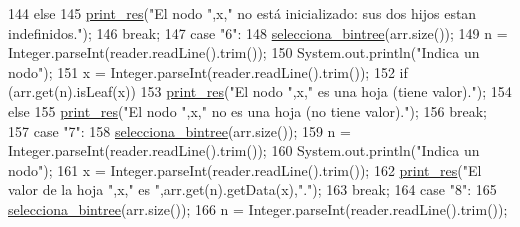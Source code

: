 \begin{DoxyCode}
144                         \textcolor{keywordflow}{else} 
145                             \hyperlink{classdomini_1_1utils_1_1Driver____BinTree_a434e26afb3eb701558d81b0fd1c29dcb}{print\_res}(\textcolor{stringliteral}{"El nodo "},x,\textcolor{stringliteral}{" no está inicializado: sus dos hijos estan
       indefinidos."});
146                     \textcolor{keywordflow}{break};
147                     \textcolor{keywordflow}{case} \textcolor{stringliteral}{"6"}:
148                         \hyperlink{classdomini_1_1utils_1_1Driver____BinTree_a0d90bf2cb928174547e712140b5a4fe5}{selecciona\_bintree}(arr.size());
149                         n = Integer.parseInt(reader.readLine().trim());
150                         System.out.println(\textcolor{stringliteral}{"Indica un nodo"});
151                         x = Integer.parseInt(reader.readLine().trim());
152                         \textcolor{keywordflow}{if} (arr.get(n).isLeaf(x))
153                             \hyperlink{classdomini_1_1utils_1_1Driver____BinTree_a434e26afb3eb701558d81b0fd1c29dcb}{print\_res}(\textcolor{stringliteral}{"El nodo "},x,\textcolor{stringliteral}{" es una hoja (tiene valor)."});
154                         \textcolor{keywordflow}{else} 
155                             \hyperlink{classdomini_1_1utils_1_1Driver____BinTree_a434e26afb3eb701558d81b0fd1c29dcb}{print\_res}(\textcolor{stringliteral}{"El nodo "},x,\textcolor{stringliteral}{" no es una hoja (no tiene valor)."});
156                     \textcolor{keywordflow}{break};
157                     \textcolor{keywordflow}{case} \textcolor{stringliteral}{"7"}:
158                         \hyperlink{classdomini_1_1utils_1_1Driver____BinTree_a0d90bf2cb928174547e712140b5a4fe5}{selecciona\_bintree}(arr.size());
159                         n = Integer.parseInt(reader.readLine().trim());
160                         System.out.println(\textcolor{stringliteral}{"Indica un nodo"});
161                         x = Integer.parseInt(reader.readLine().trim());
162                         \hyperlink{classdomini_1_1utils_1_1Driver____BinTree_a434e26afb3eb701558d81b0fd1c29dcb}{print\_res}(\textcolor{stringliteral}{"El valor de la hoja "},x,\textcolor{stringliteral}{" es "},arr.get(n).getData(x),\textcolor{stringliteral}{"."});
163                     \textcolor{keywordflow}{break};
164                     \textcolor{keywordflow}{case} \textcolor{stringliteral}{"8"}:
165                         \hyperlink{classdomini_1_1utils_1_1Driver____BinTree_a0d90bf2cb928174547e712140b5a4fe5}{selecciona\_bintree}(arr.size());
166                         n = Integer.parseInt(reader.readLine().trim());

\end{DoxyCode}
